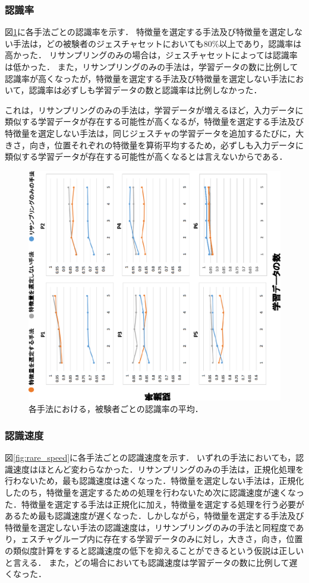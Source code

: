\subsubsection{認識率}
図\ref{fig:rare_rec}に各手法ごとの認識率を示す．
特徴量を選定する手法及び特徴量を選定しない手法は，どの被験者のジェスチャセットにおいても80\%以上であり，認識率は高かった．
リサンプリングのみの場合は，ジェスチャセットによっては認識率は低かった．
また，リサンプリングのみの手法は，学習データの数に比例して認識率が高くなったが，特徴量を選定する手法及び特徴量を選定しない手法において，認識率は必ずしも学習データの数と認識率は比例しなかった．

これは，リサンプリングのみの手法は，学習データが増えるほど，入力データに類似する学習データが存在する可能性が高くなるが，特徴量を選定する手法及び特徴量を選定しない手法は，同じジェスチャの学習データを追加するたびに，大きさ，向き，位置それぞれの特徴量を算術平均するため，必ずしも入力データに類似する学習データが存在する可能性が高くなるとは言えないからである．

\begin{figure}[!h]
\centering
\includegraphics[width=0.85\columnwidth,angle=-90]{img/pre_rec.eps}
\caption{各手法における，被験者ごとの認識率の平均．}
\label{fig:rare_rec}
\end{figure}

\subsubsection{認識速度}
図\ref{fig:rare_speed}に各手法ごとの認識速度を示す．
いずれの手法においても，認識速度はほとんど変わらなかった．リサンプリングのみの手法は，正規化処理を行わないため，最も認識速度は速くなった．特徴量を選定しない手法は，正規化したのち，特徴量を選定するための処理を行わないため次に認識速度が速くなった．特徴量を選定する手法は正規化に加え，特徴量を選定する処理を行う必要があるため最も認識速度が遅くなった．しかしながら，特徴量を選定する手法及び特徴量を選定しない手法の認識速度は，リサンプリングのみの手法と同程度であり，ェスチャグループ内に存在する学習データのみに対し，大きさ，向き，位置の類似度計算をすると認識速度の低下を抑えることができるという仮説は正しいと言える．
また，どの場合においても認識速度は学習データの数に比例して遅くなった．


